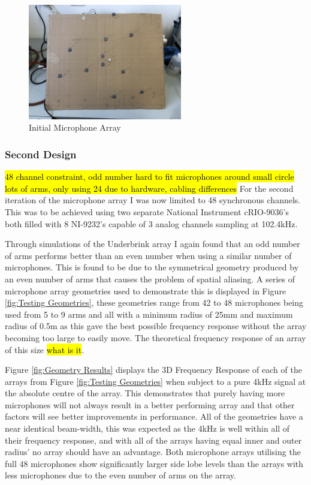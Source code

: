 \documentclass{UoNMCHA}
\numberwithin{equation}{section}
\begin{document}
    \begin{figure} [H]
        \centering
        \includegraphics[keepaspectratio, width = 0.6\textwidth]{Figures/CardboardArray.jpeg}
        \caption{Initial Microphone Array}
        \label{fig:TestArray}
    \end{figure}
    
\subsubsection{Second Design} \label{sec:Second Array Design}
    \hl{48 channel constraint, odd number hard to fit microphones around small circle lots of arms, only using 24 due to hardware, cabling differences}
    For the second iteration of the microphone array I was now limited to 48 synchronous channels. This was to be achieved using two separate National Instrument cRIO-9036's both filled with 8 NI-9232's capable of 3 analog channels sampling at 102.4kHz.
    
    Through simulations of the Underbrink array I again found that an odd number of arms performs better than an even number when using a similar number of microphones. This is found to be due to the symmetrical geometry produced by an even number of arms that causes the problem of spatial aliasing. A series of microphone array geometries used to demonstrate this is displayed in Figure \ref{fig:Testing Geometries}, these geometries range from 42 to 48 microphones being used from 5 to 9 arms and all with a minimum radius of 25mm and maximum radius of 0.5m as this gave the best possible frequency response without the array becoming too large to easily move. The theoretical frequency response of an array of this size \hl{what is it}.
    
    Figure \ref{fig:Geometry Results} displays the 3D Frequency Response of each of the arrays from Figure \ref{fig:Testing Geometries} when subject to a pure 4kHz signal at the absolute centre of the array. This demonstrates that purely having more microphones will not always result in a better performing array and that other factors will see better improvements in performance. All of the geometries have a near identical beam-width, this was expected as the 4kHz is well within all of their frequency response, and with all of the arrays having equal inner and outer radius' no array should have an advantage. Both microphone arrays utilising the full 48 microphones show significantly larger side lobe levels than the arrays with less microphones due to the even number of arms on the array.
    
\end{document}
